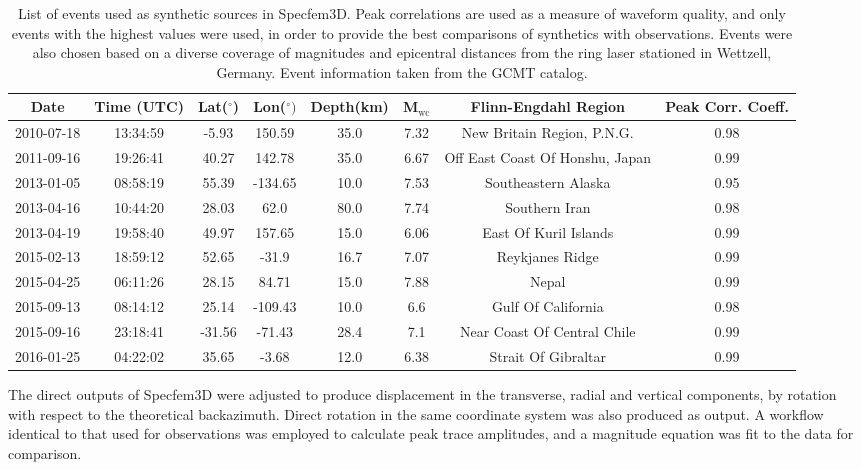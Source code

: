 \documentclass{gji}
\begin{document}
\begin{table*}
\begin{minipage}{150mm}
	\begin{center}
		\begin{tabular}{ |c|c|c|c|c|c|c|c| } 
		\bf{Date} & \bf{Time (UTC)} & \bf{Lat($^\circ$)} & \bf{Lon($^\circ)$} & \bf{Depth(km)} & \bf{M$_{\text{wc}}$} &\bf{Flinn-Engdahl Region} &\bf{Peak Corr. Coeff.}\\ \hline
	2010-07-18 & 13:34:59 & -5.93 & 150.59 & 35.0 & 7.32 & New Britain Region, P.N.G. & 0.98\\
	2011-09-16 & 19:26:41 & 40.27 & 142.78 & 35.0 & 6.67 & Off East Coast Of Honshu, Japan & 0.99\\
	2013-01-05 & 08:58:19 & 55.39 & -134.65 & 10.0 & 7.53 & Southeastern Alaska & 0.95\\
	2013-04-16 & 10:44:20 & 28.03 & 62.0 & 80.0 & 7.74 & Southern Iran & 0.98\\
	2013-04-19 & 19:58:40 & 49.97 & 157.65 & 15.0 & 6.06 & East Of Kuril Islands & 0.99\\
	2015-02-13 & 18:59:12 & 52.65 & -31.9 & 16.7 & 7.07 & Reykjanes Ridge & 0.99\\
	2015-04-25 & 06:11:26 & 28.15 & 84.71 & 15.0 & 7.88 & Nepal & 0.99\\
	2015-09-13 & 08:14:12 & 25.14 & -109.43 & 10.0 & 6.6 & Gulf Of California & 0.98\\
	2015-09-16 & 23:18:41 & -31.56 & -71.43 & 28.4 & 7.1 & Near Coast Of Central Chile & 0.99\\
	2016-01-25 & 04:22:02 & 35.65 & -3.68 & 12.0 & 6.38 & Strait Of Gibraltar & 0.99\\
		\end{tabular}
    		\caption{List of events used as synthetic sources in Specfem3D. Peak correlations are used as a measure of waveform quality, and only events with the highest values were used, in order to provide the best comparisons of synthetics with observations. Events were also chosen based on a diverse coverage of magnitudes and epicentral distances from the ring laser stationed in Wettzell, Germany. Event information taken from the GCMT catalog.}
		\label{tab:syn_events}
	\end{center}
	\end{minipage}
\end{table*}

The direct outputs of Specfem3D were adjusted to produce displacement in the transverse, radial and vertical components, by rotation with respect to the theoretical backazimuth. Direct rotation in the same coordinate system was also produced as output. A workflow identical to that used for observations was employed to calculate peak trace amplitudes, and a magnitude equation was fit to the data for comparison.
\end{document}
